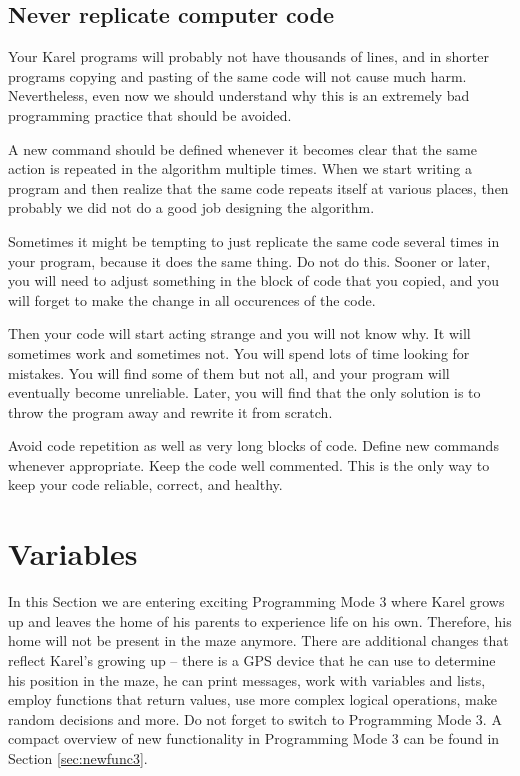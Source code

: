 \subsection{Never replicate computer code}

Your Karel programs will probably not have thousands of lines, 
and in shorter programs copying and pasting of the same code 
will not cause much harm. Nevertheless, even now we should 
understand why this is an extremely bad programming practice
that should be avoided. 

A new command should be defined whenever it becomes clear that the same 
action is repeated in the algorithm multiple times. When we start writing a program and then realize that the same
code repeats itself at various places, then probably we did not do a good job 
designing the algorithm.

Sometimes it might be tempting to just replicate the same code several 
times in your program, because it does the same thing. Do not do this.
Sooner or later, you will need to adjust something in the block of 
code that you copied, and you will forget to make the change in all
occurences of the code. 

Then your code will start acting strange and you will not know why.
It will sometimes work and sometimes not. You will spend lots of time 
looking for mistakes. You will find some of them but not all, and your 
program will eventually become unreliable. Later, you will find that 
the only solution is to throw the program away and rewrite it from scratch.\\

\begin{gbox}
\begin{center}
Avoid code repetition as well as very long blocks of code. Define new commands whenever 
appropriate. Keep the code well commented. This is the only way to keep your code 
reliable, correct, and healthy.  
\end{center}
\end{gbox}
\vspace{4mm}

\noindent



\section{Variables} \label{sec:var}

In this Section we are entering exciting Programming Mode 3 where Karel grows up and leaves the 
home of his parents to experience life on his own. Therefore, his home will not be 
present in the maze anymore. There are additional changes
that reflect Karel's growing up -- there is a GPS 
device that he can use to determine his position in the maze, he can print messages, 
work with variables and lists, employ functions that return values, use more complex 
logical operations, make random 
decisions and more. Do not forget to switch to 
Programming Mode 3. A compact overview of new functionality in Programming Mode 3 can be found 
in Section \ref{sec:newfunc3}.

